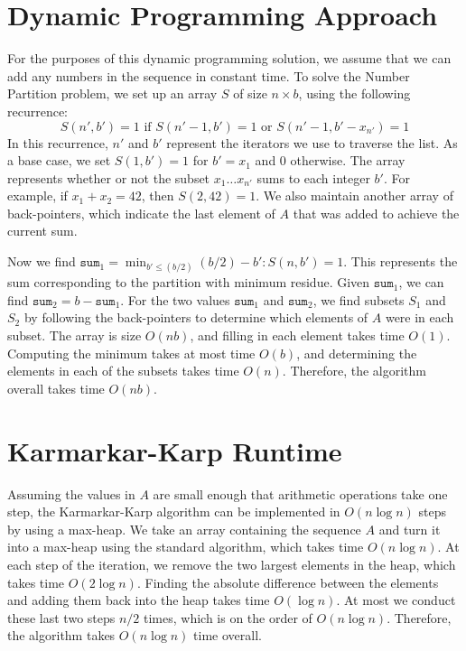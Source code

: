 \documentclass[solution, letterpaper]{cs121}
\begin{document}

\section*{Dynamic Programming Approach}
\hspace{4mm} For the purposes of this dynamic programming solution, we assume that we can add any numbers in the sequence in constant time. To solve the Number Partition problem, we set up an array $S$ of size $n \times b$, using the following recurrence:
$$S(n',b') = 1 \text{ if } S(n'-1,b')=1 \text{ or } S(n'-1,b'-x_{n'})=1$$
\hspace{4mm} In this recurrence, $n'$ and $b'$ represent the iterators we use to traverse the list. As a base case, we set $S(1,b') = 1$ for $b' = x_1$ and $0$ otherwise. The array represents whether or not the subset $x_1 \ldots x_{n'}$ sums to each integer $b'$. For example, if $x_1 + x_2 = 42$, then $S(2,42) = 1$. We also maintain another array of back-pointers, which indicate the last element of $A$ that was added to achieve the current sum.

Now we find $\texttt{sum}_1 = \min_{b' \leq (b/2)}{(b/2) - b' : S(n,b') = 1}$. This represents the sum corresponding to the partition with minimum residue. Given $\texttt{sum}_1$, we can find $\texttt{sum}_2 = b - \texttt{sum}_1$. For the two values $\texttt{sum}_1$ and $\texttt{sum}_2$, we find subsets $S_1$ and $S_2$ by following the back-pointers to determine which elements of $A$ were in each subset. The array is size $O(nb)$, and filling in each element takes time $O(1)$. Computing the minimum takes at most time $O(b)$, and determining the elements in each of the subsets takes time $O(n)$. Therefore, the algorithm overall takes time $O(nb)$.

\section*{Karmarkar-Karp Runtime}
\hspace{4mm} Assuming the values in $A$ are small enough that arithmetic operations take one step, the Karmarkar-Karp algorithm can be implemented in $O(n \log{n})$ steps by using a max-heap. We take an array containing the sequence $A$ and turn it into a max-heap using the standard algorithm, which takes time $O(n \log{n})$. At each step of the iteration, we remove the two largest elements in the heap, which takes time $O(2 \log{n})$. Finding the absolute difference between the elements and adding them back into the heap takes time $O(\log{n})$. At most we conduct these last two steps $n/2$ times, which is on the order of $O(n \log{n})$. Therefore, the algorithm takes $O(n \log{n})$ time overall.
\end{document}
